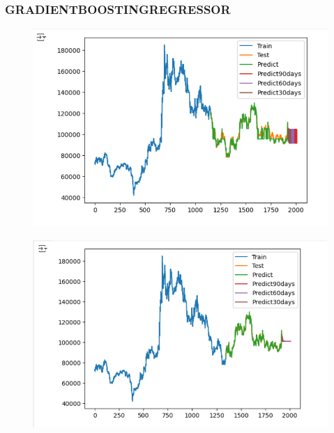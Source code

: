 \documentclass[conference]{IEEEtran}
\begin{document}
\subsubsection{GRADIENTBOOSTINGREGRESSOR}

\begin{figure}[H]
    \centering
    \begin{minipage}{0.15\textwidth}
    \centering
    \includegraphics[width=1\textwidth]{Image/GradientBoosting/LG_6_4_GradientBoostingRegressor.png}
   
    \label{fig:1}
    \end{minipage}%
    \begin{minipage}{0.15\textwidth}
    \centering
    \includegraphics[width=1\textwidth]{Image/GradientBoosting/LG_7_3_GradientBoostingRegressor.png}
  

\end{minipage}
\end{figure}
\end{document}
